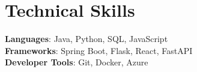 \documentclass[letterpaper,11pt]{article}
\begin{document}
\section{Technical Skills}
 \begin{itemize}[leftmargin=0.15in, label={}]
    \small{\item{
     \textbf{Languages}{: Java, Python, SQL, JavaScript} \\
     \textbf{Frameworks}{: Spring Boot, Flask, React, FastAPI} \\
     \textbf{Developer Tools}{: Git, Docker, Azure}
    }}
 \end{itemize}
\end{document}

